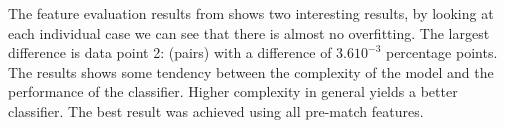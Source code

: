 The feature evaluation results from  shows two interesting results, by looking at each individual case we can see that there is almost no overfitting. The largest difference is data point 2: (pairs) with a difference of $3.610^{-3}$ percentage points. The results shows some tendency between the complexity of the model and the performance of the classifier. Higher complexity in general yields a better classifier. The best result was achieved using all pre-match features.




